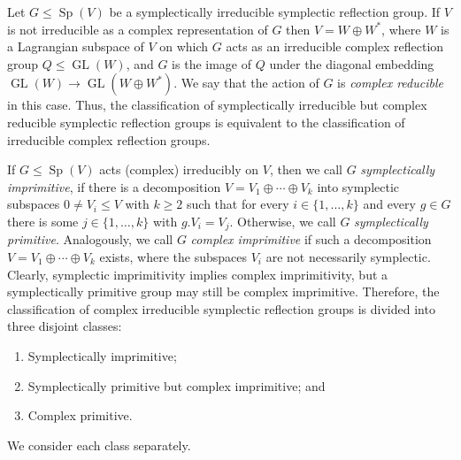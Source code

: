 \documentclass[a4paper]{amsart}
\theoremstyle{plain}
\theoremstyle{definition}
\theoremstyle{remark}
\DeclareMathOperator{\GL}{GL}
\DeclareMathOperator{\Sp}{Sp}
\begin{document}
Let \(G\leqslant\Sp(V)\) be a symplectically irreducible symplectic reflection group.
If $V$ is not irreducible as a complex representation of \(G\) then $V = W \oplus W^\ast$, where $W$ is a Lagrangian subspace of $V$ on which $G$ acts as an irreducible complex reflection group \(Q \leqslant \GL(W) \), and $G$ is the image of $Q$ under the diagonal embedding \(\GL(W) \to \GL(W \oplus W^\ast)\). We say that the action of $G$ is \emph{complex reducible} in this case. Thus, the classification of symplectically irreducible but complex reducible symplectic reflection groups is equivalent to the classification of irreducible complex reflection groups.

If \(G\leqslant\Sp(V)\) acts (complex) irreducibly on \(V\), then we call \(G\) \emph{symplectically imprimitive}, if there is a decomposition \(V = V_1\oplus \cdots \oplus V_k\) into symplectic subspaces \(0\neq V_i\leqslant V\) with $k \geqslant 2$ such that for every \(i\in \{1,\dots, k\}\) and every \(g\in G\) there is some \(j\in\{1,\dots, k\}\) with \(g.V_i = V_j\). Otherwise, we call \(G\) \emph{symplectically primitive}. Analogously, we call \(G\) \emph{complex imprimitive} if such a decomposition \(V = V_1\oplus \cdots \oplus V_k\) exists, where the subspaces \(V_i\) are not necessarily symplectic.
Clearly, symplectic imprimitivity implies complex imprimitivity, but a symplectically primitive group may still be complex imprimitive. Therefore, the classification of complex irreducible symplectic reflection groups is divided into three disjoint classes:
\begin{enumerate}
	\item[-] Symplectically imprimitive; 
	\item[-] Symplectically primitive but complex imprimitive; and
	\item[-] Complex primitive. 
\end{enumerate}
We consider each class separately. 
\end{document}
